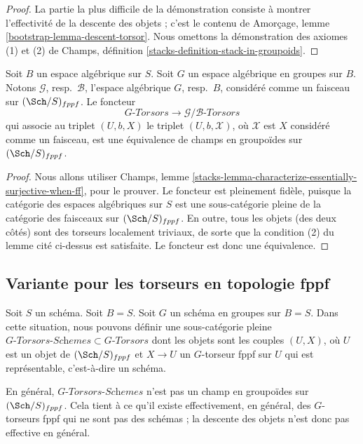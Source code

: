 \begin{proof}
La partie la plus difficile de la démonstration consiste à montrer l'effectivité
de la descente des objets ; c'est le contenu de
Amorçage, lemme \ref{bootstrap-lemma-descent-torsor}.
Nous omettons la démonstration des axiomes (1) et (2) de
Champs, définition \ref{stacks-definition-stack-in-groupoids}.
\end{proof}

\begin{lemma}
\label{lemma-compare-torsors}
Soit $B$ un espace algébrique sur $S$. Soit $G$ un espace algébrique en
groupes sur $B$. Notons $\mathcal{G}$, resp.\ $\mathcal{B}$, l'espace algébrique
$G$, resp.\ $B$, considéré comme un faisceau sur $(\Sch/S)_{fppf}$.
Le foncteur
$$
G\textit{-Torsors} \longrightarrow \mathcal{G}/\mathcal{B}\textit{-Torsors}
$$
qui associe au triplet $(U, b, X)$ le triplet
$(U, b, \mathcal{X})$, où $\mathcal{X}$ est $X$ considéré comme un faisceau,
est une équivalence de champs en groupoïdes sur $(\Sch/S)_{fppf}$.
\end{lemma}

\begin{proof}
Nous allons utiliser
Champs, lemme \ref{stacks-lemma-characterize-essentially-surjective-when-ff},
pour le prouver. Le foncteur est pleinement fidèle, puisque la catégorie des
espaces algébriques sur $S$ est une sous-catégorie pleine de la catégorie des
faisceaux sur $(\Sch/S)_{fppf}$.
En outre, tous les objets (des deux côtés) sont des torseurs localement triviaux,
de sorte que la condition (2) du lemme cité ci-dessus est satisfaite.
Le foncteur est donc une équivalence.
\end{proof}



\subsection{Variante pour les torseurs en topologie fppf}
\label{subsection-variant-fppf-torsors}

\noindent
Soit $S$ un schéma. Soit $B = S$.
Soit $G$ un schéma en groupes sur $B = S$.
Dans cette situation, nous pouvons définir une sous-catégorie pleine
$G\textit{-Torsors-Schemes} \subset G\textit{-Torsors}$
dont les objets sont les couples $(U, X)$, où $U$ est un objet de
$(\Sch/S)_{fppf}$ et $X \to U$ un
$G$-torseur fppf sur $U$ qui est représentable, c'est-à-dire un schéma.

\medskip\noindent
En général, $G\textit{-Torsors-Schemes}$ n'est pas
un champ en groupoïdes sur $(\Sch/S)_{fppf}$. Cela tient
à ce qu'il existe effectivement, en général, des $G$-torseurs fppf
qui ne sont pas des schémas ; la descente des objets n'est donc pas effective
en général.




